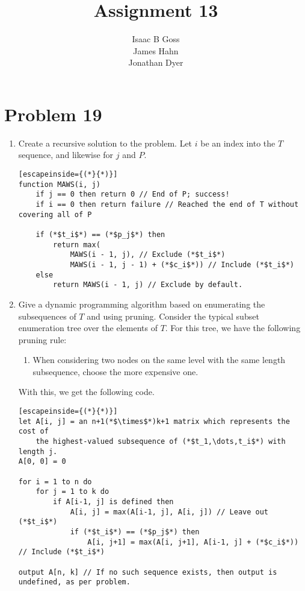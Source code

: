 \documentclass{article}
\author{Isaac B Goss\\ James Hahn\\ Jonathan Dyer}
\title{Assignment 13}
\providecommand{\prob}[1]{\section*{Problem #1}}
\begin{document}
\maketitle

    \prob{19}
    \begin{enumerate}[label=(\alph*)]
        \item Create a recursive solution to the problem.
            Let $i$ be an index into the $T$ sequence, and likewise for $j$ and $P$.
            \begin{lstlisting}[escapeinside={(*}{*)}]
function MAWS(i, j)
    if j == 0 then return 0 // End of P; success!
    if i == 0 then return failure // Reached the end of T without covering all of P

    if (*$t_i$*) == (*$p_j$*) then
        return max(
            MAWS(i - 1, j), // Exclude (*$t_i$*)
            MAWS(i - 1, j - 1) + (*$c_i$*)) // Include (*$t_i$*)
    else
        return MAWS(i - 1, j) // Exclude by default.
            \end{lstlisting}
        \item Give a dynamic programming algorithm based on enumerating the subsequences of $T$ and using pruning.
            Consider the typical subset enumeration tree over the elements of $T$.
            For this tree, we have the following pruning rule:
            \begin{enumerate}[label=\arabic*.]
                \item When considering two nodes on the same level with the same length subsequence, choose the more expensive one.
            \end{enumerate}

            With this, we get the following code.
            \begin{lstlisting}[escapeinside={(*}{*)}]
let A[i, j] = an n+1(*$\times$*)k+1 matrix which represents the cost of
    the highest-valued subsequence of (*$t_1,\dots,t_i$*) with length j.
A[0, 0] = 0

for i = 1 to n do
    for j = 1 to k do
        if A[i-1, j] is defined then
            A[i, j] = max(A[i-1, j], A[i, j]) // Leave out (*$t_i$*)
            if (*$t_i$*) == (*$p_j$*) then
                A[i, j+1] = max(A[i, j+1], A[i-1, j] + (*$c_i$*)) // Include (*$t_i$*)

output A[n, k] // If no such sequence exists, then output is undefined, as per problem.
            \end{lstlisting}


\end{enumerate}
\end{document}
